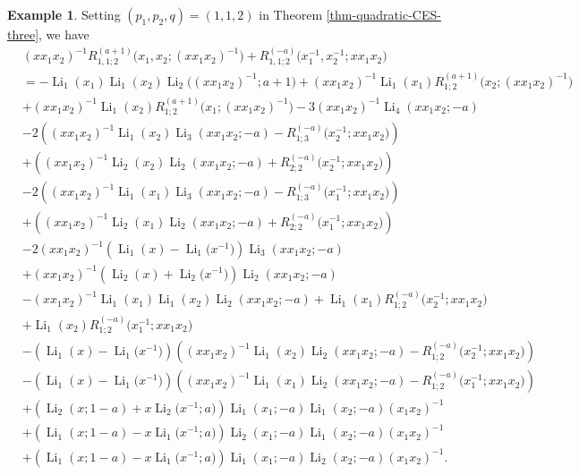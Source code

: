 \documentclass[11pt]{article}
\DeclareMathOperator{\Li}{Li}
\theoremstyle{plain}
\theoremstyle{definition}
\newtheorem{exa}[thm]{Example}
\begin{document}
\begin{exa}Setting $(p_1,p_2,q)=(1,1,2)$ in Theorem \ref{thm-quadratic-CES-three}, we have
\begin{align*}
	&(xx_1x_2)^{-1}R^{(a+1)}_{1,1;2}\Big(x_1,x_2;(xx_1x_2)^{-1}\Big)+R_{1,1;2}^{(-a)}\Big(x_1^{-1},x_2^{-1};xx_1x_2\Big)\\
	&=-\Li_{1}(x_1)\Li_{1}(x_2)\Li_2\Big((xx_1x_2)^{-1};a+1\Big)+(xx_1x_2)^{-1}\Li_{1}(x_1)R^{(a+1)}_{1;2}\Big(x_2;(xx_1x_2)^{-1}\Big)\nonumber\\
	&+(xx_1x_2)^{-1}\Li_{1}(x_2)R^{(a+1)}_{1;2}\Big(x_1;(xx_1x_2)^{-1}\Big)-3(xx_1x_2)^{-1}\Li_{4}(xx_1x_2;-a)\nonumber\\
	&-2\left((xx_1x_2)^{-1}\Li_{1}(x_{2})\Li_{3}(xx_1x_{2};-a)-R_{1;3}^{(-a)}\Big(x_2^{-1};xx_1x_2\Big)\right)\\
	&+\left((xx_1x_2)^{-1}\Li_{2}(x_{2})\Li_{2}(xx_1x_{2};-a)+R_{2;2}^{(-a)}\Big(x_2^{-1};xx_1x_2\Big)\right)\nonumber\\
	&-2\left((xx_1x_2)^{-1}\Li_{1}(x_{1})\Li_{3}(xx_1x_{2};-a)-R_{1;3}^{(-a)}\Big(x_1^{-1};xx_1x_2\Big)\right)\\
	&+\left((xx_1x_2)^{-1}\Li_{2}(x_{1})\Li_{2}(xx_1x_{2};-a)+R_{2;2}^{(-a)}\Big(x_1^{-1};xx_1x_2\Big)\right)\\
	&-2(xx_1x_2)^{-1}\left(\Li_{1}(x)-\Li_{1}\Big(x^{-1}\Big)\right)\Li_{3}(xx_1x_2;-a)\\
	&+(xx_1x_2)^{-1}\left(\Li_{2}(x)+\Li_{2}\Big(x^{-1}\Big)\right)\Li_{2}(xx_1x_2;-a)\nonumber\\
	&-(xx_1x_2)^{-1}\Li_1(x_1)\Li_1(x_2)\Li_2(xx_1x_2;-a)+\Li_1(x_1)R_{1;2}^{(-a)}\Big(x_2^{-1};xx_1x_2\Big)\nonumber\\
	&+\Li_1(x_2)R_{1;2}^{(-a)}\Big(x_1^{-1};xx_1x_2\Big)\nonumber\\
	&-\left(\Li_{1}(x)-\Li_{1}\Big(x^{-1}\Big)\right)\left((xx_1x_2)^{-1}\Li_{1}(x_{2})\Li_{2}(xx_1x_{2};-a)-R^{(-a)}_{1;2}\Big(x_{2}^{-1};xx_1x_2\Big)\right)\\
	&-\left(\Li_{1}(x)-\Li_{1}\Big(x^{-1}\Big)\right)\left((xx_1x_2)^{-1}\Li_{1}(x_{1})\Li_{2}(xx_1x_{2};-a)-R^{(-a)}_{1;2}\Big(x_{1}^{-1};xx_1x_2\Big)\right)\nonumber\\
	&+\left(\Li_{2}(x;1-a)+x \Li_{2}\Big(x^{-1};a\Big) \right)\Li_{1}(x_1;-a)\Li_{1}(x_2;-a)(x_1x_2)^{-1}\\
	&+\left(\Li_{1}(x;1-a)-x \Li_{1}\Big(x^{-1};a\Big) \right)\Li_{2}(x_1;-a)\Li_{1}(x_2;-a)(x_1x_2)^{-1}\\
	&+\left(\Li_{1}(x;1-a)-x \Li_{1}\Big(x^{-1};a\Big) \right)\Li_{1}(x_1;-a)\Li_{2}(x_2;-a)(x_1x_2)^{-1}.

\end{align*}
\end{exa}
\end{document}
